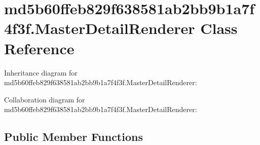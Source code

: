 \hypertarget{classmd5b60ffeb829f638581ab2bb9b1a7f4f3f_1_1_master_detail_renderer}{}\section{md5b60ffeb829f638581ab2bb9b1a7f4f3f.\+Master\+Detail\+Renderer Class Reference}
\label{classmd5b60ffeb829f638581ab2bb9b1a7f4f3f_1_1_master_detail_renderer}


Inheritance diagram for md5b60ffeb829f638581ab2bb9b1a7f4f3f.\+Master\+Detail\+Renderer\+:


Collaboration diagram for md5b60ffeb829f638581ab2bb9b1a7f4f3f.\+Master\+Detail\+Renderer\+:
\subsection*{Public Member Functions}
